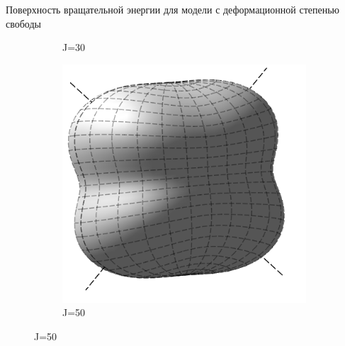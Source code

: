 \documentclass[hyperref={pdfpagelabels=false},usepdftitle=false, xcolor = dvipsnames]{beamer}
\begin{document}
\begin{frame}{Поверхность вращательной энергии для модели с деформационной степенью свободы}
\begin{varblock}[11cm]{}
\begin{figure}
\begin{subfigure}{0.3\textwidth}
		  \caption{J=30}
		\end{subfigure}
		\begin{subfigure}{0.3\textwidth}
		  \includegraphics[width=\textwidth]{../pictures/Rigid_RES_50.png}
		  \caption{J=50}
		\end{subfigure}  
	  \end{figure}
  \end{varblock}    
\end{frame}
\end{document}
